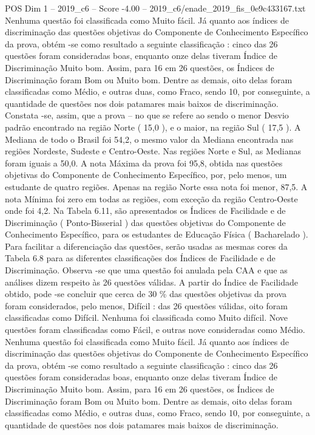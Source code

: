 \begin{textsample}{POS Dim 1 – 2019\_c6 – Score -4.00 – 2019\_c6/enade\_2019\_fis\_0e9c433167.txt}
Nenhuma questão foi classificada como Muito fácil.
Já quanto aos índices de discriminação das questões objetivas do Componente de Conhecimento Específico da prova, obtém -se como resultado a seguinte classificação : cinco das 26 questões foram consideradas boas, enquanto onze delas tiveram Índice de Discriminação Muito bom.
Assim, para 16 em 26 questões, os Índices de Discriminação foram Bom ou Muito bom.
Dentre as demais, oito delas foram classificadas como Médio, e outras duas, como Fraco, sendo 10, por conseguinte, a quantidade de questões nos dois patamares mais baixos de discriminação.
Constata -se, assim, que a prova – no que se refere ao sendo o menor Desvio padrão encontrado na região Norte ( 15,0 ), e o maior, na região Sul ( 17,5 ).
A Mediana de todo o Brasil foi 54,2, o mesmo valor da Mediana encontrada nas regiões Nordeste, Sudeste e Centro-Oeste.
Nas regiões Norte e Sul, as Medianas foram iguais a 50,0.
A nota Máxima da prova foi 95,8, obtida nas questões objetivas do Componente de Conhecimento Específico, por, pelo menos, um estudante de quatro regiões.
Apenas na região Norte essa nota foi menor, 87,5.
A nota Mínima foi zero em todas as regiões, com exceção da região Centro-Oeste onde foi 4,2.
Na Tabela 6.11, são apresentados os Índices de Facilidade e de Discriminação ( Ponto-Bisserial ) das questões objetivas do Componente de Conhecimento Específico, para os estudantes de Educação Física ( Bacharelado ).
Para facilitar a diferenciação das questões, serão usadas as mesmas cores da Tabela 6.8 para as diferentes classificações dos Índices de Facilidade e de Discriminação.
Observa -se que uma questão foi anulada pela CAA e que as análises dizem respeito às 26 questões válidas.
A partir do Índice de Facilidade obtido, pode -se concluir que cerca de 30 \% das questões objetivas da prova foram considerados, pelo menos, Difícil : das 26 questões válidas, oito foram classificadas como Difícil.
Nenhuma foi classificada como Muito difícil.
Nove questões foram classificadas como Fácil, e outras nove consideradas como Médio.
Nenhuma questão foi classificada como Muito fácil.
Já quanto aos índices de discriminação das questões objetivas do Componente de Conhecimento Específico da prova, obtém -se como resultado a seguinte classificação : cinco das 26 questões foram consideradas boas, enquanto onze delas tiveram Índice de Discriminação Muito bom.
Assim, para 16 em 26 questões, os Índices de Discriminação foram Bom ou Muito bom.
Dentre as demais, oito delas foram classificadas como Médio, e outras duas, como Fraco, sendo 10, por conseguinte, a quantidade de questões nos dois patamares mais baixos de discriminação.

\end{textsample}
